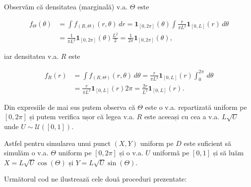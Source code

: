 \documentclass[]{article}
\begin{document}
Observăm că densitatea (marginală) v.a. \(\Theta\) este

\[
\begin{aligned}
  f_{\Theta}(\theta) &= \int f_{(R,\Theta)}(r,\theta)\,dr = \mathbf{1}_{[0,2\pi]}(\theta)\int \frac{r}{\pi L^2} \mathbf{1}_{[0,L]}(r)\,d\theta\\
                     &= \frac{1}{\pi L^2} \mathbf{1}_{[0,2\pi]}(\theta) \frac{L^2}{2} = \frac{1}{2\pi} \mathbf{1}_{[0,2\pi]}(\theta),
\end{aligned}
\]

iar densitatea v.a. \(R\) este

\[
\begin{aligned}
  f_{R}(r) &= \int f_{(R,\Theta)}(r,\theta)\,d\theta = \frac{r}{\pi L^2} \mathbf{1}_{[0,L]}(r)\int_{0}^{2\pi}\,d\theta\\
                     &= \frac{r}{\pi L^2} \mathbf{1}_{[0,L]}(r)2\pi = \frac{2r}{L^2} \mathbf{1}_{[0,L]}(r).
\end{aligned}
\]

Din expresiile de mai sus putem observa că \(\Theta\) este o v.a.
repartizată uniform pe \([0,2\pi]\) și putem verifica ușor că legea v.a.
\(R\) este aceeași cu cea a v.a. \(L\sqrt{U}\) unde
\(U\sim\mathcal{U}([0,1])\).

Astfel pentru simularea unui punct \((X,Y)\) uniform pe \(D\) este
suficient să simulăm o v.a. \(\Theta\) uniform pe \([0,2\pi]\) și o v.a.
\(U\) uniformă pe \([0,1]\) și să luăm \(X=L\sqrt{U}\cos(\Theta)\) și
\(Y=L\sqrt{U}\sin(\Theta)\).

Următorul cod ne ilustrează cele două proceduri prezentate:
\end{document}
